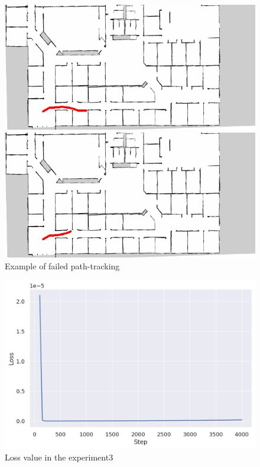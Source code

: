 \begin{figure}[h]
  \begin{minipage}[b]{0.45\linewidth}
    \centering
    \includegraphics[keepaspectratio, scale=0.35]{images/9cam/traject19.png}
    \subcaption{}
  \end{minipage}
  \begin{minipage}[b]{0.45\linewidth}
    \centering
    \includegraphics[keepaspectratio, scale=0.35]{images/9cam/traject26.png}
    \subcaption{}
  \end{minipage}
\caption{Example of failed path-tracking}
\label{Fig:fail6}
\end{figure}

\begin{figure}[h]
  \centering
  \includegraphics[keepaspectratio, scale=0.55]{images/exp3_25.png}
  \caption{Loss value in the experiment3}
  \label{Fig:sample3}
\end{figure}

